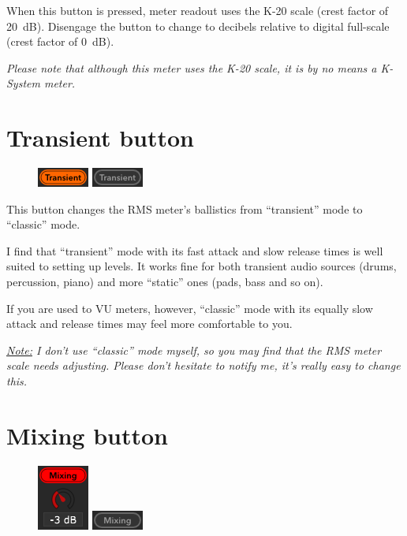 When this button is pressed, meter readout uses the K-20 scale (crest
factor of \SI{20}{\dB}).  Disengage the button to change to decibels
relative to digital full-scale (crest factor of \SI{0}{\dB}).

\emph{Please note that although this meter uses the K-20 scale, it is
  by no means a K-System meter.}

\newpage %

\section{Transient button}
\label{sec:transient_button}

\begin{figure}
\includegraphics[scale=\screenshotscale,clip]{include/images/button_transient_on.png}
\newline \vspace{-0.9\baselineskip}
\includegraphics[scale=\screenshotscale,clip]{include/images/button_transient_off.png}
\end{figure}

This button changes the RMS meter's ballistics from ``transient'' mode
to ``classic'' mode.

I find that ``transient'' mode with its fast attack and slow release
times is well suited to setting up levels.  It works fine for both
transient audio sources (drums, percussion, piano) and more ``static''
ones (pads, bass and so on).

If you are used to VU meters, however, ``classic'' mode with its
equally slow attack and release times may feel more comfortable to
you.

\emph{\underline{Note:} I don't use ``classic'' mode myself, so you
  may find that the RMS meter scale needs adjusting.  Please don't
  hesitate to notify me, it's really easy to change this.}

\section{Mixing button}
\label{sec:mixing_button}

\begin{figure}
\includegraphics[scale=\screenshotscale,clip]{include/images/button_mixing_on.png}
\newline \vspace{-0.9\baselineskip}
\includegraphics[scale=\screenshotscale,clip]{include/images/button_mixing_off.png}
\end{figure}

